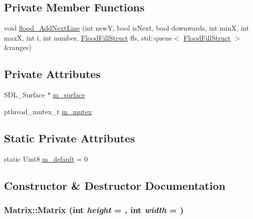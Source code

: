 \subsection*{Private Member Functions}
\begin{DoxyCompactItemize}
\item 
void \hyperlink{classMatrix_aaa3962d9bf27f654bd6771a8d5bfaeac}{flood\_\-AddNextLine} (int newY, bool isNext, bool downwards, int minX, int maxX, int i, int number, \hyperlink{structMatrix_1_1FloodFillStruct}{FloodFillStruct} ffs, std::queue$<$ \hyperlink{structMatrix_1_1FloodFillStruct}{FloodFillStruct} $>$ \&ranges)
\end{DoxyCompactItemize}
\subsection*{Private Attributes}
\begin{DoxyCompactItemize}
\item 
SDL\_\-Surface $\ast$ \hyperlink{classMatrix_a76ecc20ed053f699bcf299958be9f4a1}{m\_\-surface}
\item 
pthread\_\-mutex\_\-t \hyperlink{classMatrix_aba01078d3f7abfceae9f6ce1913bbdc3}{m\_\-mutex}
\end{DoxyCompactItemize}
\subsection*{Static Private Attributes}
\begin{DoxyCompactItemize}
\item 
static Uint8 \hyperlink{classMatrix_a128eca9782b86bae0eed3d1d0967249e}{m\_\-default} = 0
\end{DoxyCompactItemize}


\subsection{Constructor \& Destructor Documentation}
\hypertarget{classMatrix_a1cf5bd8134711df6f63e1dbef1912b86}{
\subsubsection[{Matrix}]{\setlength{\rightskip}{0pt plus 5cm}Matrix::Matrix (int {\em height} = {}, \/  int {\em width} = {})}}
\label{classMatrix_a1cf5bd8134711df6f63e1dbef1912b86}

